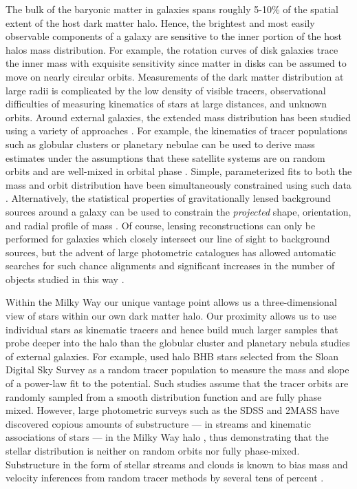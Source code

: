 \documentclass{emulateapj}
\begin{document}
The bulk of the baryonic matter in galaxies spans roughly 5-10\% of the spatial extent of the host dark matter halo. Hence, the brightest and most easily observable components of a galaxy are sensitive to the inner portion of the host halos mass distribution. For example, the rotation curves of disk galaxies trace the inner mass with exquisite sensitivity since matter in disks can be assumed to move on nearly circular orbits. Measurements of the dark matter distribution at large radii is complicated by the low density of visible tracers, observational difficulties of measuring kinematics of stars at large distances, and unknown orbits. Around external galaxies, the extended mass distribution has been studied using a variety of approaches \citep[see][for a a complete and detailed review]{courteau13}. For example, the kinematics of tracer populations such as globular clusters or planetary nebulae can be used to derive mass estimates under the assumptions that these satellite systems are on random orbits and are well-mixed in orbital phase \citep[early investigations include][]{mendez01,cote03}. Simple, parameterized fits to both the mass and orbit distribution have been simultaneously constrained using such data \citep[e.g.][]{napolitano11,deason12c}. Alternatively, the statistical properties of gravitationally lensed background sources around a galaxy can be used to constrain the \emph{projected} shape, orientation, and radial profile of mass \citep[see, for example, the Lens Structure and Dynamics Survey described in][]{koopmans02}. Of course, lensing reconstructions can only be performed for galaxies which closely intersect our line of sight to background sources, but the advent of large photometric catalogues has allowed automatic searches for such chance alignments and significant increases in the number of objects studied in this way \citep[e.g. the Sloan Lens ACS Survey, see][]{bolton06}.

Within the Milky Way our unique vantage point allows us a three-dimensional view of stars within our own dark matter halo. Our proximity allows us to use individual stars as kinematic tracers and hence build much larger samples that probe deeper into the halo than the globular cluster and planetary nebula studies of external galaxies. For example, \cite{deason12a} used halo BHB stars selected from the Sloan Digital Sky Survey \cite[SDSS;][]{york00} as a random tracer population to measure the mass and slope of a power-law fit to the potential. Such studies assume that the tracer orbits are randomly sampled from a smooth distribution function and are fully phase mixed. However, large photometric surveys such as the SDSS and 2MASS \citep{skrutskie06} have discovered copious amounts of substructure --- in streams and kinematic associations of stars --- in the Milky Way halo \citep[e.g.,][]{belokurov06, rochapinto04}, thus demonstrating that the stellar distribution is neither on random orbits nor fully phase-mixed. Substructure in the form of stellar streams and clouds is known to bias mass and velocity inferences from random tracer methods by several tens of percent \citep{yencho06}.
\end{document}

